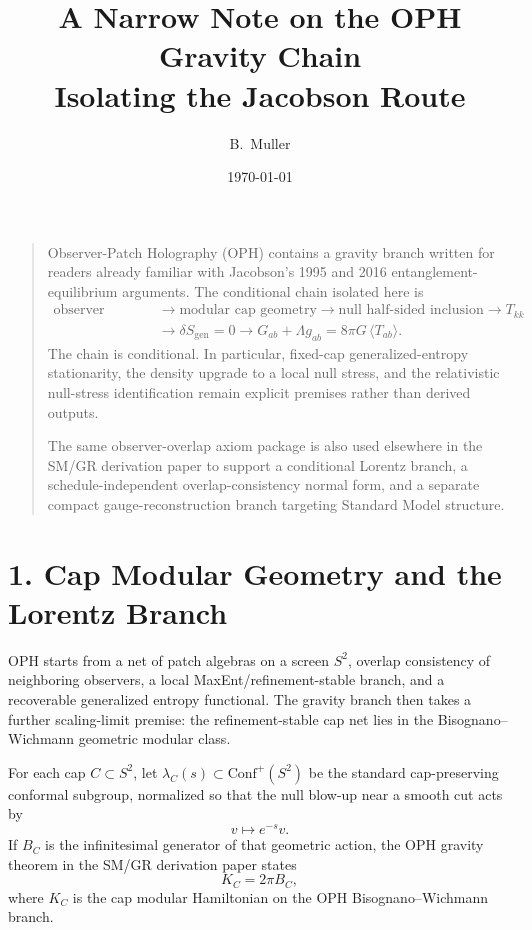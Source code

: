 \documentclass[10pt]{article}
\title{A Narrow Note on the OPH Gravity Chain\\[0.3em]\large Isolating the Jacobson Route}
\author{B.\ Muller}
\date{\today}
\newcommand{\Conf}{\mathrm{Conf}}
\begin{document}
\maketitle

\begin{quote}\small
Observer-Patch Holography (OPH) contains a gravity branch written for readers already familiar with Jacobson's 1995 and 2016 entanglement-equilibrium arguments. The conditional chain isolated here is
\[
\begin{aligned}
\text{observer overlap}
&\to \text{modular cap geometry}
\to \text{null half-sided inclusion}
\to T_{kk} \\
&\to \delta S_{\mathrm{gen}}=0
\to G_{ab}+\Lambda g_{ab}=8\pi G\,\langle T_{ab}\rangle.
\end{aligned}
\]
The chain is conditional. In particular, fixed-cap generalized-entropy stationarity, the density upgrade to a local null stress, and the relativistic null-stress identification remain explicit premises rather than derived outputs.

The same observer-overlap axiom package is also used elsewhere in the SM/GR derivation paper to support a conditional Lorentz branch, a schedule-independent overlap-consistency normal form, and a separate compact gauge-reconstruction branch targeting Standard Model structure.
\end{quote}

\section*{1. Cap Modular Geometry and the Lorentz Branch}

OPH starts from a net of patch algebras on a screen \(S^2\), overlap consistency of neighboring observers, a local MaxEnt/refinement-stable branch, and a recoverable generalized entropy functional. The gravity branch then takes a further scaling-limit premise: the refinement-stable cap net lies in the Bisognano--Wichmann geometric modular class.

For each cap \(C \subset S^2\), let \(\lambda_C(s) \subset \Conf^+(S^2)\) be the standard cap-preserving conformal subgroup, normalized so that the null blow-up near a smooth cut acts by
\[
v \mapsto e^{-s} v.
\]
If \(B_C\) is the infinitesimal generator of that geometric action, the OPH gravity theorem in the SM/GR derivation paper states
\[
K_C = 2\pi B_C,
\]
where \(K_C\) is the cap modular Hamiltonian on the OPH Bisognano--Wichmann branch.
\end{document}

